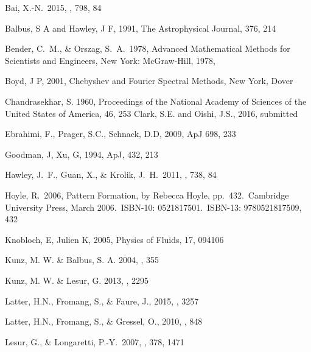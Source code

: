 \documentclass[twocolumn]{aastex61}
\begin{document}
\begin{thebibliography}{}

 Bai, X.-N.\ 2015, \apj, 798, 84 

Balbus, S A and Hawley, J F, 1991, The Astrophysical Journal, 376, 214

 Bender, C.~M., \& Orszag, S.~A.\ 1978, Advanced Mathematical Methods for Scientists and Engineers, New York: McGraw-Hill, 1978,

Boyd, J P, 2001, Chebyshev and Fourier Spectral Methods, New York, Dover

Chandrasekhar, S. 1960, Proceedings of the National Academy of Sciences of the United States of America, 46, 253
Clark, S.E. and Oishi, J.S., 2016, submitted

Ebrahimi, F., Prager, S.C., Schnack, D.D, 2009, ApJ 698, 233

Goodman, J, Xu, G, 1994, ApJ, 432, 213

 Hawley, J.~F., Guan, X., \& Krolik, J.~H.\ 2011, \apj, 738, 84 

 Hoyle, R.\ 2006, Pattern
  Formation, by Rebecca Hoyle, pp.~432.~Cambridge University Press,
  March 2006.~ISBN-10: 0521817501.~ISBN-13: 9780521817509, 432

Knobloch, E, Julien K, 2005, Physics of Fluids, 17, 094106

Kunz, M. W. \& Balbus, S. A. 2004, , 355

Kunz, M. W. \& Lesur, G. 2013, , 2295

Latter, H.N., Fromang, S., \& Faure, J., 2015, , 3257

  Latter, H.N., Fromang, S., \& Gressel, O., 2010, , 848

 Lesur, G., \&
  Longaretti, P.-Y.\ 2007, \mnras, 378, 1471


\end{thebibliography}
\end{document}
